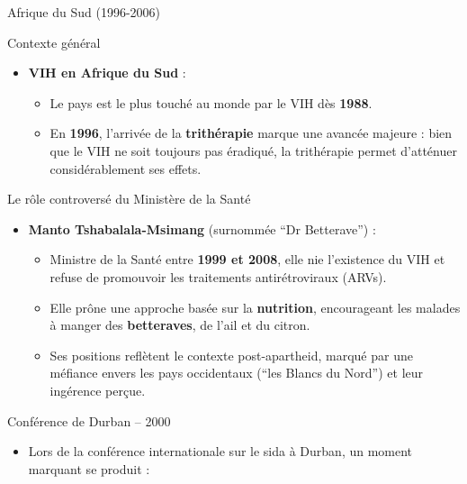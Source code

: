\documentclass[
  ignorenonframetext,
]{beamer}
\providecommand{\tightlist}{%
  \setlength{\itemsep}{0pt}\setlength{\parskip}{0pt}}\usepackage{longtable,booktabs,array}
\begin{document}
\begin{frame}{Afrique du Sud (1996-2006)}
\protect\hypertarget{afrique-du-sud-1996-2006}{}
\begin{block}{Contexte général}
\protect\hypertarget{contexte-guxe9nuxe9ral}{}
\begin{itemize}
\tightlist
\item
  \textbf{VIH en Afrique du Sud} :

  \begin{itemize}
  \tightlist
  \item
    Le pays est le plus touché au monde par le VIH dès \textbf{1988}.
  \item
    En \textbf{1996}, l'arrivée de la \textbf{trithérapie} marque une
    avancée majeure : bien que le VIH ne soit toujours pas éradiqué, la
    trithérapie permet d'atténuer considérablement ses effets.
  \end{itemize}
\end{itemize}
\end{block}

\begin{block}{Le rôle controversé du Ministère de la Santé}
\protect\hypertarget{le-ruxf4le-controversuxe9-du-ministuxe8re-de-la-santuxe9}{}
\begin{itemize}
\tightlist
\item
  \textbf{Manto Tshabalala-Msimang} (surnommée ``Dr Betterave'') :

  \begin{itemize}
  \tightlist
  \item
    Ministre de la Santé entre \textbf{1999 et 2008}, elle nie
    l'existence du VIH et refuse de promouvoir les traitements
    antirétroviraux (ARVs).
  \item
    Elle prône une approche basée sur la \textbf{nutrition},
    encourageant les malades à manger des \textbf{betteraves}, de l'ail
    et du citron.
  \item
    Ses positions reflètent le contexte post-apartheid, marqué par une
    méfiance envers les pays occidentaux (``les Blancs du Nord'') et
    leur ingérence perçue.
  \end{itemize}
\end{itemize}
\end{block}

\begin{block}{Conférence de Durban -- 2000}
\protect\hypertarget{confuxe9rence-de-durban-2000}{}
\begin{itemize}
\tightlist
\item
  Lors de la conférence internationale sur le sida à Durban, un moment
  marquant se produit :


\end{itemize}
\end{block}
\end{frame}
\end{document}
